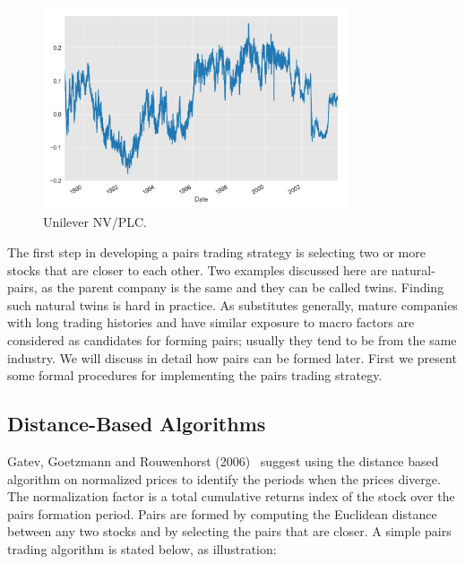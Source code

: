 	\begin{figure}[!ht]
	\centering
	\includegraphics[width=0.8\textwidth]{chapters/chapter_stat_ts/figures/rd_un.png}
	\caption{Unilever NV/PLC. \label{fig:3nvplc}}
	\end{figure}

The first step in developing a pairs trading strategy is selecting two or more stocks that are closer to each other. Two examples discussed here are natural-pairs, as the parent company is the same and they can be called twins. Finding such natural twins is hard in practice. As substitutes generally, mature companies with long trading histories and have similar exposure to macro factors are considered as candidates for forming pairs; usually they tend to be from the same industry. We will discuss in detail how pairs can be formed later. First we present some formal procedures for implementing the pairs trading strategy.


\subsection{Distance-Based Algorithms\label{subsec:dis_based_alg}}

Gatev, Goetzmann and Rouwenhorst (2006)~\cite{ggr} suggest using the distance based algorithm on normalized prices to identify the periods when the prices diverge. The normalization factor is a total cumulative returns index of the stock over the pairs formation period. Pairs are formed by computing the Euclidean distance between any two stocks and by selecting the pairs that are closer. A simple pairs trading algorithm is stated below, as illustration: \medbreak


